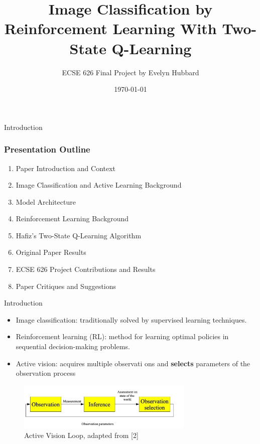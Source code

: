 \documentclass[14pt]{beamer}
\title[]{Image Classification by Reinforcement Learning With Two-State Q-Learning}
\author{ECSE 626 Final Project by Evelyn Hubbard}
\institute[]{Original Paper by: Abdul Mueed Hafiz [1]}
\date[\textcolor{white}{\today} ]
{\today}
\begin{document}
\frame{\titlepage}

    \begin{frame}{Introduction}
    \frametitle{Presentation Outline}
        \begin{enumerate}
            \item Paper Introduction and Context
            \item Image Classification and Active Learning Background
            \item Model Architecture
            \item Reinforcement Learning Background
            \item Hafiz's Two-State Q-Learning Algorithm
            \item Original Paper Results
            \item ECSE 626 Project Contributions and Results
            \item Paper Critiques and Suggestions
        \end{enumerate}
    \end{frame}
\begin{frame}{Introduction}
    \fontsize{12pt}{7.2}\selectfont
\begin{itemize}
    \item Image classification: traditionally solved by supervised learning techniques.
    \item Reinforcement learning (RL): method for learning optimal policies in sequential decision-making problems.
    \item Active vision: acquires multiple observati
    ons and \textbf{selects} parameters of the observation process
    \end{itemize}
    \begin{figure}
        \centering
        \includegraphics[width=0.75\textwidth]{activeloop.jpg}
        \caption{Active Vision Loop, adapted from [2]}
    \end{figure}
\end{frame}
\end{document}
